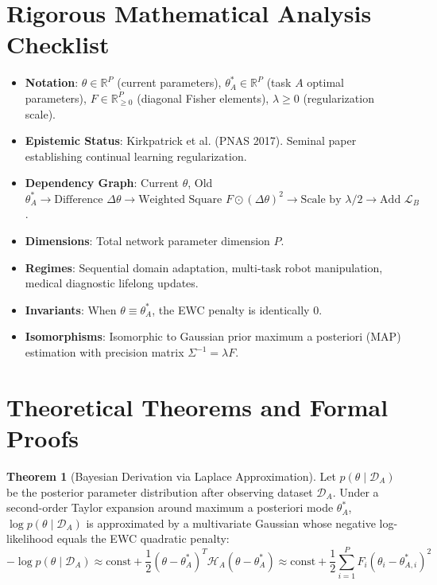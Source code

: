 \documentclass[11pt,a4paper]{article}
\theoremstyle{definition}
\newtheorem{theorem}{\textbf{Theorem}}[section]
\begin{document}
\section{Rigorous Mathematical Analysis Checklist}

\begin{itemize}
    \item \textbf{Notation}: $\theta \in \mathbb{R}^P$ (current parameters), $\theta_A^* \in \mathbb{R}^P$ (task $A$ optimal parameters), $F \in \mathbb{R}_{\ge 0}^P$ (diagonal Fisher elements), $\lambda \ge 0$ (regularization scale).
    \item \textbf{Epistemic Status}: Kirkpatrick et al. (PNAS 2017). Seminal paper establishing continual learning regularization.
    \item \textbf{Dependency Graph}: Current $\theta$, Old $\theta_A^* \to \text{Difference } \Delta \theta \to \text{Weighted Square } F \odot (\Delta \theta)^2 \to \text{Scale by } \lambda/2 \to \text{Add } \mathcal{L}_B$.
    \item \textbf{Dimensions}: Total network parameter dimension $P$.
    \item \textbf{Regimes}: Sequential domain adaptation, multi-task robot manipulation, medical diagnostic lifelong updates.
    \item \textbf{Invariants}: When $\theta \equiv \theta_A^*$, the EWC penalty is identically $0$.
    \item \textbf{Isomorphisms}: Isomorphic to Gaussian prior maximum a posteriori (MAP) estimation with precision matrix $\Sigma^{-1} = \lambda F$.
\end{itemize}

\section{Theoretical Theorems and Formal Proofs}

\begin{theorem}[Bayesian Derivation via Laplace Approximation]
Let $p(\theta \mid \mathcal{D}_A)$ be the posterior parameter distribution after observing dataset $\mathcal{D}_A$. Under a second-order Taylor expansion around maximum a posteriori mode $\theta_A^*$, $\log p(\theta \mid \mathcal{D}_A)$ is approximated by a multivariate Gaussian whose negative log-likelihood equals the EWC quadratic penalty:
{\boldmath
\begin{equation}
-\log p(\theta \mid \mathcal{D}_A) \approx \text{const} + \frac{1}{2} (\theta - \theta_A^*)^T \mathcal{H}_A (\theta - \theta_A^*) \approx \text{const} + \frac{1}{2} \sum_{i=1}^P F_i (\theta_i - \theta_{A, i}^*)^2
\end{equation}
}
\end{theorem}
\end{document}
